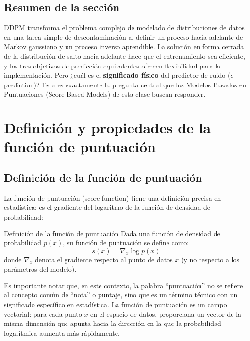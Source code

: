 \documentclass[a4paper]{article}
\begin{document}
\subsection{Resumen de la sección}

DDPM transforma el problema complejo de modelado de distribuciones de datos en una tarea simple de descontaminación al definir un proceso hacia adelante de Markov gaussiano y un proceso inverso aprendible. La solución en forma cerrada de la distribución de salto hacia adelante hace que el entrenamiento sea eficiente, y los tres objetivos de predicción equivalentes ofrecen flexibilidad para la implementación. Pero ¿cuál es el \textbf{significado físico} del predictor de ruido ($\epsilon$-prediction)? Esta es exactamente la pregunta central que los Modelos Basados en Puntuaciones (Score-Based Models) de esta clase buscan responder.


\section{Definición y propiedades de la función de puntuación}

\subsection{Definición de la función de puntuación}

La función de puntuación (score function) tiene una definición precisa en estadística: es el gradiente del logaritmo de la función de densidad de probabilidad:

\begin{importantbox}{Definición de la función de puntuación}
Dada una función de densidad de probabilidad $p(x)$, su función de puntuación se define como:
$$s(x) = \nabla_x \log p(x)$$
donde $\nabla_x$ denota el gradiente respecto al punto de datos $x$ (y no respecto a los parámetros del modelo).
\end{importantbox}

Es importante notar que, en este contexto, la palabra ``puntuación'' no se refiere al concepto común de ``nota'' o puntaje, sino que es un término técnico con un significado específico en estadística. La función de puntuación es un campo vectorial: para cada punto $x$ en el espacio de datos, proporciona un vector de la misma dimensión que apunta hacia la dirección en la que la probabilidad logarítmica aumenta más rápidamente.
\end{document}
